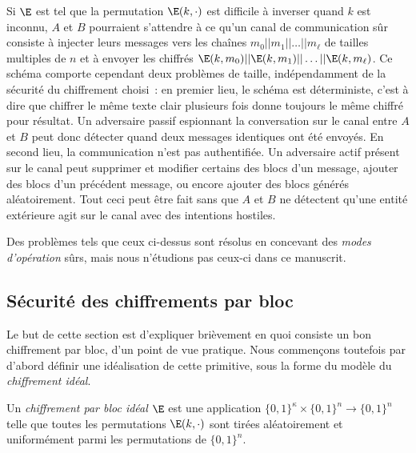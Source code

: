 Si $\E$ est tel que la permutation $\E(k,\cdot)$ est difficile à inverser quand $k$ est inconnu, $A$ et $B$
pourraient s'attendre à ce qu'un canal de communication sûr consiste à injecter leurs messages
vers les chaînes
$m_0||m_1||\ldots||m_\ell$ de tailles multiples de $n$ et à envoyer les chiffrés
$\E(k,m_0)||\E(k,m_1)||\ldots||\E(k,m_\ell)$.
Ce schéma comporte cependant deux problèmes de taille, indépendamment de la sécurité du chiffrement choisi~:
en premier lieu, le schéma est déterministe, c'est à dire que chiffrer le même texte clair plusieurs fois donne toujours le
même chiffré pour résultat. Un adversaire passif espionnant la conversation sur le canal entre $A$ et $B$ peut donc
détecter quand deux messages identiques ont été envoyés. En second lieu, la communication n'est pas authentifiée. Un
adversaire actif présent sur le canal peut supprimer et modifier certains des blocs d'un message,
ajouter des blocs d'un précédent message, ou encore ajouter des blocs générés aléatoirement. Tout ceci peut
être fait sans que $A$ et $B$ ne détectent qu'une entité extérieure agit sur le canal avec des intentions hostiles.

Des problèmes tels que ceux ci-dessus sont résolus en concevant des \emph{modes d'opération} sûrs, mais nous n'étudions
pas ceux-ci dans ce manuscrit.

\subsection{Sécurité des chiffrements par bloc}

Le but de cette section est d'expliquer brièvement en
quoi consiste un bon chiffrement par bloc, d'un point de vue pratique. Nous commençons toutefois par d'abord
définir une idéalisation de cette primitive, sous la forme du modèle du \emph{chiffrement idéal}.

\begin{fdefi}
Un \emph{chiffrement par bloc idéal} $\E$ est une application
$\{0,1\}^\kappa \times \{0,1\}^n \rightarrow \{0,1\}^n$ telle que toutes les permutations
$\E(k,\cdot)$ sont tirées aléatoirement et uniformément parmi les permutations de $\{0,1\}^n$.
\end{fdefi}

